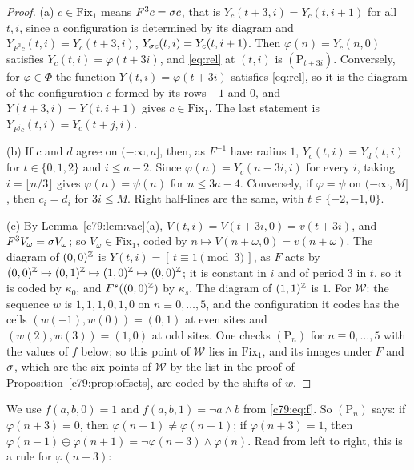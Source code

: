 \begin{proof}
(a) $c\in\mathrm{Fix}_1$ means $F^3c=\sigma c$, that is $Y_c(t+3,i)=Y_c(t,i+1)$ for all $t,i$, since a configuration is determined by its diagram and $Y_{F^3c}(t,i)=Y_c(t+3,i)$, $Y_{\sigma c}(t,i)=Y_c(t,i+1)$. Then $\varphi(n)=Y_c(n,0)$ satisfies $Y_c(t,i)=\varphi(t+3i)$, and \eqref{eq:rel} at $(t,i)$ is $(\mathrm P_{t+3i})$. Conversely, for $\varphi\in\Phi$ the function $Y(t,i)=\varphi(t+3i)$ satisfies \eqref{eq:rel}, so it is the diagram of the configuration $c$ formed by its rows $-1$ and $0$, and $Y(t+3,i)=Y(t,i+1)$ gives $c\in\mathrm{Fix}_1$. The last statement is $Y_{F^jc}(t,i)=Y_c(t+j,i)$.

(b) If $c$ and $d$ agree on $(-\infty,a]$, then, as $F^{\pm1}$ have radius $1$, $Y_c(t,i)=Y_d(t,i)$ for $t\in\{0,1,2\}$ and $i\le a-2$. Since $\varphi(n)=Y_c(n-3i,i)$ for every $i$, taking $i=\lfloor n/3\rfloor$ gives $\varphi(n)=\psi(n)$ for $n\le 3a-4$. Conversely, if $\varphi=\psi$ on $(-\infty,M]$, then $c_i=d_i$ for $3i\le M$. Right half-lines are the same, with $t\in\{-2,-1,0\}$.

(c) By Lemma~\ref{c79:lem:vac}(a), $V(t,i)=V(t+3i,0)=v(t+3i)$, and $F^3V_\omega=\sigma V_\omega$; so $V_\omega\in\mathrm{Fix}_1$, coded by $n\mapsto V(n+\omega,0)=v(n+\omega)$. The diagram of $(0,0)^{\mathbb{Z}}$ is $Y(t,i)=[\,t\equiv1\pmod3\,]$, as $F$ acts by $(0,0)^{\mathbb{Z}}\mapsto(0,1)^{\mathbb{Z}}\mapsto(1,0)^{\mathbb{Z}}\mapsto(0,0)^{\mathbb{Z}}$; it is constant in $i$ and of period $3$ in $t$, so it is coded by $\kappa_0$, and $F^s((0,0)^{\mathbb{Z}})$ by $\kappa_s$. The diagram of $(1,1)^{\mathbb{Z}}$ is $1$. For $\mathcal W$: the sequence $w$ is $1,1,1,0,1,0$ on $n\equiv0,\dots,5$, and the configuration it codes has the cells $(w(-1),w(0))=(0,1)$ at even sites and $(w(2),w(3))=(1,0)$ at odd sites. One checks $(\mathrm P_n)$ for $n\equiv0,\dots,5$ with the values of $f$ below; so this point of $\mathcal W$ lies in $\mathrm{Fix}_1$, and its images under $F$ and $\sigma$, which are the six points of $\mathcal W$ by the list in the proof of Proposition~\ref{c79:prop:offsets}, are coded by the shifts of $w$.
\end{proof}

We use $f(a,b,0)=1$ and $f(a,b,1)=\neg a\wedge b$ from \eqref{c79:eq:f}. So $(\mathrm P_n)$ says: if $\varphi(n+3)=0$, then $\varphi(n-1)\ne\varphi(n+1)$; if $\varphi(n+3)=1$, then $\varphi(n-1)\oplus\varphi(n+1)=\neg\varphi(n-3)\wedge\varphi(n)$. Read from left to right, this is a rule for $\varphi(n+3)$:

